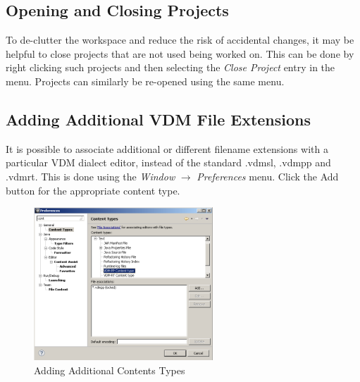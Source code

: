\documentclass{overturerepchap}
\begin{document}
\subsection{Opening and Closing Projects}

To de-clutter the workspace and reduce the risk of accidental changes,
it may be helpful to close projects that are not used being worked on.
This can be done by right clicking such projects and then selecting the
\emph{Close Project} entry in the menu. Projects can similarly be re-opened
using the same menu.


\subsection{Adding Additional VDM File Extensions}

It is possible to associate additional or different filename extensions with a
particular VDM dialect editor, instead of the standard {\ttfamily .vdmsl},
{\ttfamily .vdmpp} and {\ttfamily .vdmrt}. This is done using the \emph{Window}
$\rightarrow$ \emph{Preferences} menu. Click the Add
button for the appropriate content type.

\begin{figure}[!htb]
\begin{center}
\includegraphics[width=0.6\textwidth]{screenDumps/contentstypes}
\caption{Adding Additional Contents Types\label{fig:ContentsTypes}}
\end{center}
\end{figure}
\end{document}

